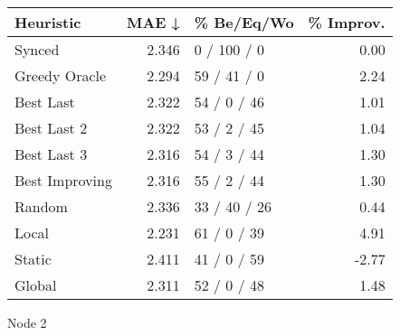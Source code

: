 \begin{tabular}{lrlr}
\toprule
\textbf{Heuristic} & \textbf{MAE ↓} & \textbf{\% Be/Eq/Wo} & \textbf{\% Improv.} \\
\midrule
            Synced &          2.346 &          0 / 100 / 0 &                0.00 \\
     Greedy Oracle &          2.294 &          59 / 41 / 0 &                2.24 \\
         Best Last &          2.322 &          54 / 0 / 46 &                1.01 \\
       Best Last 2 &          2.322 &          53 / 2 / 45 &                1.04 \\
       Best Last 3 &          2.316 &          54 / 3 / 44 &                1.30 \\
    Best Improving &          2.316 &          55 / 2 / 44 &                1.30 \\
            Random &          2.336 &         33 / 40 / 26 &                0.44 \\
             Local &          2.231 &          61 / 0 / 39 &                4.91 \\
            Static &          2.411 &          41 / 0 / 59 &               -2.77 \\
            Global &          2.311 &          52 / 0 / 48 &                1.48 \\
\bottomrule
\end{tabular}
\caption{Node 2}
\label{tab:ds_non_lr01_le2_bs2_2}
